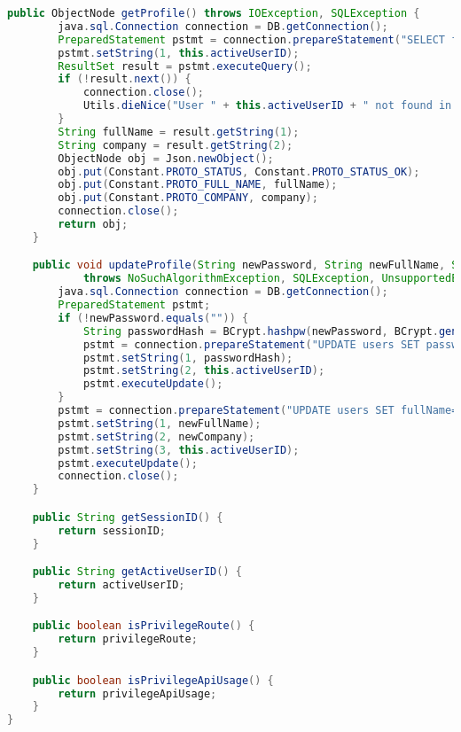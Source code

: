 \begin{lstlisting}[language=Java,basicstyle=\tiny,caption=models/User.java,label={lst:user.java}]
	public ObjectNode getProfile() throws IOException, SQLException {
		java.sql.Connection connection = DB.getConnection();
		PreparedStatement pstmt = connection.prepareStatement("SELECT fullName, company FROM users WHERE email=?");
		pstmt.setString(1, this.activeUserID);
		ResultSet result = pstmt.executeQuery();
		if (!result.next()) {
			connection.close();
			Utils.dieNice("User " + this.activeUserID + " not found in database.");
		}
		String fullName = result.getString(1);
		String company = result.getString(2);
		ObjectNode obj = Json.newObject();
		obj.put(Constant.PROTO_STATUS, Constant.PROTO_STATUS_OK);
		obj.put(Constant.PROTO_FULL_NAME, fullName);
		obj.put(Constant.PROTO_COMPANY, company);
		connection.close();
		return obj;
	}

	public void updateProfile(String newPassword, String newFullName, String newCompany)
			throws NoSuchAlgorithmException, SQLException, UnsupportedEncodingException {
		java.sql.Connection connection = DB.getConnection();
		PreparedStatement pstmt;
		if (!newPassword.equals("")) {
			String passwordHash = BCrypt.hashpw(newPassword, BCrypt.gensalt());
			pstmt = connection.prepareStatement("UPDATE users SET password=? WHERE email=?");
			pstmt.setString(1, passwordHash);
			pstmt.setString(2, this.activeUserID);
			pstmt.executeUpdate();
		}
		pstmt = connection.prepareStatement("UPDATE users SET fullName=?, company=? WHERE email=?");
		pstmt.setString(1, newFullName);
		pstmt.setString(2, newCompany);
		pstmt.setString(3, this.activeUserID);
		pstmt.executeUpdate();
		connection.close();
	}

	public String getSessionID() {
		return sessionID;
	}

	public String getActiveUserID() {
		return activeUserID;
	}

	public boolean isPrivilegeRoute() {
		return privilegeRoute;
	}

	public boolean isPrivilegeApiUsage() {
		return privilegeApiUsage;
	}
}
\end{lstlisting}

